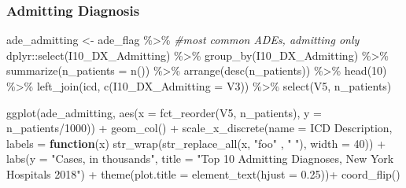 \documentclass[preprint, 3p,
authoryear]{elsarticle} %
\newenvironment{Shaded}{\begin{snugshade}}{\end{snugshade}}
\newcommand{\AttributeTok}[1]{\textcolor[rgb]{0.77,0.63,0.00}{#1}}
\newcommand{\CommentTok}[1]{\textcolor[rgb]{0.56,0.35,0.01}{\textit{#1}}}
\newcommand{\ControlFlowTok}[1]{\textcolor[rgb]{0.13,0.29,0.53}{\textbf{#1}}}
\newcommand{\DecValTok}[1]{\textcolor[rgb]{0.00,0.00,0.81}{#1}}
\newcommand{\FloatTok}[1]{\textcolor[rgb]{0.00,0.00,0.81}{#1}}
\newcommand{\FunctionTok}[1]{\textcolor[rgb]{0.00,0.00,0.00}{#1}}
\newcommand{\NormalTok}[1]{#1}
\newcommand{\OtherTok}[1]{\textcolor[rgb]{0.56,0.35,0.01}{#1}}
\newcommand{\SpecialCharTok}[1]{\textcolor[rgb]{0.00,0.00,0.00}{#1}}
\newcommand{\StringTok}[1]{\textcolor[rgb]{0.31,0.60,0.02}{#1}}
\begin{document}
\hypertarget{admitting-diagnosis}{%
\subsubsection{Admitting Diagnosis}\label{admitting-diagnosis}}

\begin{Shaded}
\begin{Highlighting}[]
\NormalTok{ade\_admitting }\OtherTok{\textless{}{-}}\NormalTok{ ade\_flag }\SpecialCharTok{\%\textgreater{}\%} \CommentTok{\#most common ADEs, admitting only}
\NormalTok{  dplyr}\SpecialCharTok{::}\FunctionTok{select}\NormalTok{(I10\_DX\_Admitting) }\SpecialCharTok{\%\textgreater{}\%}
  \FunctionTok{group\_by}\NormalTok{(I10\_DX\_Admitting) }\SpecialCharTok{\%\textgreater{}\%}
  \FunctionTok{summarize}\NormalTok{(}\AttributeTok{n\_patients =} \FunctionTok{n}\NormalTok{()) }\SpecialCharTok{\%\textgreater{}\%}
  \FunctionTok{arrange}\NormalTok{(}\FunctionTok{desc}\NormalTok{(n\_patients)) }\SpecialCharTok{\%\textgreater{}\%}
  \FunctionTok{head}\NormalTok{(}\DecValTok{10}\NormalTok{) }\SpecialCharTok{\%\textgreater{}\%}
  \FunctionTok{left\_join}\NormalTok{(icd, }\FunctionTok{c}\NormalTok{(}\StringTok{\textquotesingle{}I10\_DX\_Admitting\textquotesingle{}} \OtherTok{=} \StringTok{\textquotesingle{}V3\textquotesingle{}}\NormalTok{)) }\SpecialCharTok{\%\textgreater{}\%}
  \FunctionTok{select}\NormalTok{(V5, n\_patients)}

\FunctionTok{ggplot}\NormalTok{(ade\_admitting, }\FunctionTok{aes}\NormalTok{(}\AttributeTok{x =} \FunctionTok{fct\_reorder}\NormalTok{(V5, n\_patients), }\AttributeTok{y =}\NormalTok{ n\_patients}\SpecialCharTok{/}\DecValTok{1000}\NormalTok{)) }\SpecialCharTok{+}
  \FunctionTok{geom\_col}\NormalTok{() }\SpecialCharTok{+}
  \FunctionTok{scale\_x\_discrete}\NormalTok{(}\AttributeTok{name =} \StringTok{\textquotesingle{}ICD Description\textquotesingle{}}\NormalTok{, }\AttributeTok{labels =} \ControlFlowTok{function}\NormalTok{(x) }\FunctionTok{str\_wrap}\NormalTok{(}\FunctionTok{str\_replace\_all}\NormalTok{(x, }\StringTok{"foo"}\NormalTok{ , }\StringTok{" "}\NormalTok{), }\AttributeTok{width =} \DecValTok{40}\NormalTok{)) }\SpecialCharTok{+}
  \FunctionTok{labs}\NormalTok{(}\AttributeTok{y =} \StringTok{"Cases, in thousands"}\NormalTok{, }\AttributeTok{title =} \StringTok{"Top 10 Admitting Diagnoses, New York Hospitals 2018"}\NormalTok{) }\SpecialCharTok{+}
  \FunctionTok{theme}\NormalTok{(}\AttributeTok{plot.title =} \FunctionTok{element\_text}\NormalTok{(}\AttributeTok{hjust =} \FloatTok{0.25}\NormalTok{))}\SpecialCharTok{+}
  \FunctionTok{coord\_flip}\NormalTok{()}
\end{Highlighting}
\end{Shaded}
\end{document}
